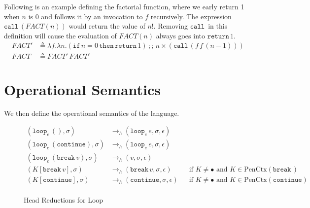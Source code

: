 \documentclass{article}
\numberwithin{algorithm}{section}
\newcommand{\cloop}[1]{\texttt{loop}_{#1}\,}
\newcommand{\cbreak}{\texttt{break}\,}
\newcommand{\ccontinue}{\texttt{continue}}
\newcommand{\cif}{\texttt{if}\,}
\newcommand{\cthen}{\,\texttt{then}\,}
\newcommand{\cseq}{\,;;\,}
\newcommand{\creturn}{\texttt{return}\,}
\newcommand{\ccall}{\texttt{call}\,}
\newcommand{\pure}[1]{\text{PenCtx}(#1)}
\newcommand{\hred}{\rightarrow_h}
\newcommand{\tred}{\rightarrow_t}
\newcommand{\tpred}{\rightarrow_{tp}}
\newcommand{\todo}[1]{\textcolor{red}{[TODO: #1]}}
\begin{document}
Following is an example defining the factorial function, where we early return 1 when $n$ is 0 and follows it by an invocation to $f$ recursively. The expression $\ccall (\textit{FACT}(n))$ would return the value of $n!$.
Removing $\ccall\!$ in this definition will cause the evaluation of $\textit{FACT}(n)$ always goes into $\creturn 1$.
$$
\begin{aligned}
    \textit{FACT}' &\triangleq \lambda f. \lambda n. (\cif n = 0 \cthen \creturn 1) \cseq n \times (\ccall (f\, f\, (n - 1))) \\
    \textit{FACT} &\triangleq \textit{FACT}'\,\textit{FACT}'
\end{aligned}
$$


\section{Operational Semantics}

We then define the operational semantics of the language.

\begin{figure}[h]
$$
\begin{aligned}
    (\cloop{e} (), \sigma) &\hred (\cloop{e} e, \sigma, \epsilon) && \\
    (\cloop{e} (\ccontinue), \sigma) &\hred (\cloop{e} e, \sigma, \epsilon) &&  \\
    (\cloop{e} (\cbreak v), \sigma) &\hred (v, \sigma, \epsilon) && \\
    (K[\cbreak v], \sigma) &\hred (\cbreak v, \sigma, \epsilon) && \text{if } K \neq \bullet \text{ and } K \in \pure{\cbreak\!} \\
    (K[\ccontinue], \sigma) &\hred (\ccontinue, \sigma, \epsilon) && \text{if } K \neq \bullet \text{ and } K \in \pure{\ccontinue} \\
\end{aligned}
$$
\caption{Head Reductions for Loop}
\label{fig:hred-loop}
\end{figure}
\end{document}
